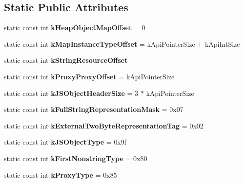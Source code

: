\subsection*{Static Public Attributes}
\begin{DoxyCompactItemize}
\item 
\hypertarget{classv8_1_1internal_1_1_internals_a0902a596b5656b4592157eaacc020512}{}static const int {\bfseries k\+Heap\+Object\+Map\+Offset} = 0\label{classv8_1_1internal_1_1_internals_a0902a596b5656b4592157eaacc020512}

\item 
\hypertarget{classv8_1_1internal_1_1_internals_a39ea290dfaa9de300bd79aa73a874a88}{}static const int {\bfseries k\+Map\+Instance\+Type\+Offset} = k\+Api\+Pointer\+Size + k\+Api\+Int\+Size\label{classv8_1_1internal_1_1_internals_a39ea290dfaa9de300bd79aa73a874a88}

\item 
static const int {\bfseries k\+String\+Resource\+Offset}
\item 
\hypertarget{classv8_1_1internal_1_1_internals_a2f7609ff68b17c9fc15d58bd2dee47aa}{}static const int {\bfseries k\+Proxy\+Proxy\+Offset} = k\+Api\+Pointer\+Size\label{classv8_1_1internal_1_1_internals_a2f7609ff68b17c9fc15d58bd2dee47aa}

\item 
\hypertarget{classv8_1_1internal_1_1_internals_af8faf3ff3271d26bafa6ca0ea87e2a57}{}static const int {\bfseries k\+J\+S\+Object\+Header\+Size} = 3 $\ast$ k\+Api\+Pointer\+Size\label{classv8_1_1internal_1_1_internals_af8faf3ff3271d26bafa6ca0ea87e2a57}

\item 
\hypertarget{classv8_1_1internal_1_1_internals_a5c39a86b30463928ea719def66916507}{}static const int {\bfseries k\+Full\+String\+Representation\+Mask} = 0x07\label{classv8_1_1internal_1_1_internals_a5c39a86b30463928ea719def66916507}

\item 
\hypertarget{classv8_1_1internal_1_1_internals_a73faf917416d2519b65c7255e77a74ce}{}static const int {\bfseries k\+External\+Two\+Byte\+Representation\+Tag} = 0x02\label{classv8_1_1internal_1_1_internals_a73faf917416d2519b65c7255e77a74ce}

\item 
\hypertarget{classv8_1_1internal_1_1_internals_a56b7062df5d9a7df491137d4c3341bcc}{}static const int {\bfseries k\+J\+S\+Object\+Type} = 0x9f\label{classv8_1_1internal_1_1_internals_a56b7062df5d9a7df491137d4c3341bcc}

\item 
\hypertarget{classv8_1_1internal_1_1_internals_a6f4a54927b01a11f444fb2f00b47ca1d}{}static const int {\bfseries k\+First\+Nonstring\+Type} = 0x80\label{classv8_1_1internal_1_1_internals_a6f4a54927b01a11f444fb2f00b47ca1d}

\item 
\hypertarget{classv8_1_1internal_1_1_internals_a6d6dcaebff54df16184fe40e63c0917c}{}static const int {\bfseries k\+Proxy\+Type} = 0x85\label{classv8_1_1internal_1_1_internals_a6d6dcaebff54df16184fe40e63c0917c}

\end{DoxyCompactItemize}


